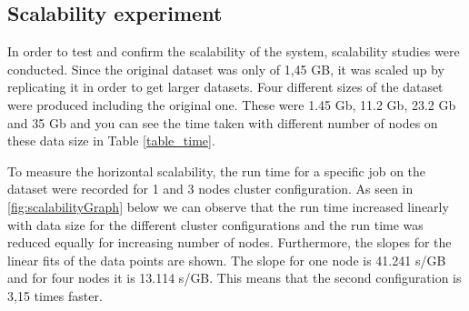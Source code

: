 



\subsection{Scalability experiment}
In order to test and confirm the scalability of the system, scalability studies were conducted. Since the original dataset was only of 1,45 GB, it was scaled up by replicating it in order to get larger datasets. Four different sizes of the dataset were produced including the original one. These were 1.45 Gb, 11.2 Gb, 23.2 Gb and 35 Gb and you can see the time taken with different number of nodes on these data size in Table \ref{table_time}.

To measure the horizontal scalability, the run time for a specific job on the dataset were recorded for 1 and 3 nodes cluster configuration. As seen in  \ref{fig:scalabilityGraph} below we can observe that
the run time increased linearly with data size for the different cluster configurations and the run time was reduced equally for increasing number of nodes. Furthermore, the slopes for the linear fits of the data points are shown. The slope for one node is 41.241 s/GB and for four nodes it is 13.114 s/GB. This means that the second configuration is 3,15 times faster.\\

